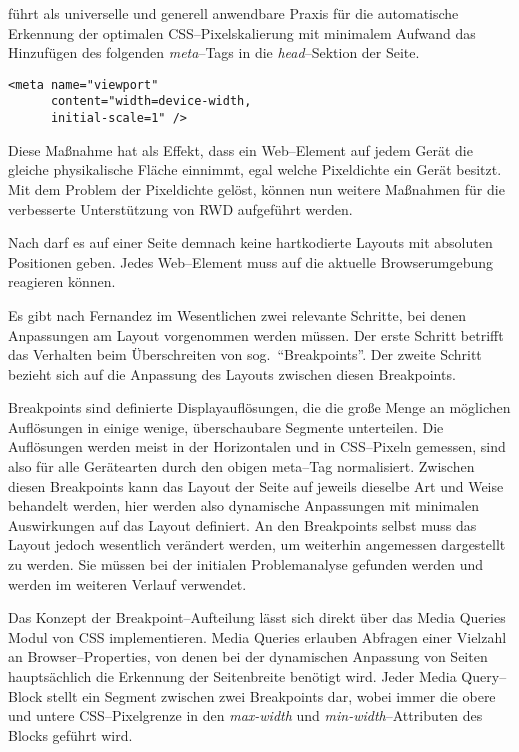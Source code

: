 \autocite{JiangResponsiveWebDesignModeAndApplication.2014} führt als universelle und generell anwendbare Praxis für die automatische Erkennung der optimalen \acs{CSS}--Pixelskalierung mit minimalem Aufwand das Hinzufügen des folgenden \emph{meta}--Tags in die \emph{head}--Sektion der Seite.

\begin{verbatim}
<meta name="viewport"
      content="width=device-width,
      initial-scale=1" />
\end{verbatim}

Diese Maßnahme hat als Effekt, dass ein Web--Element auf jedem Gerät die gleiche physikalische Fläche einnimmt, egal welche Pixeldichte ein Gerät besitzt.
Mit dem Problem der Pixeldichte gelöst, können nun weitere Maßnahmen für die verbesserte Unterstützung von \ac{RWD} aufgeführt werden.

Nach \autocite{Katajisto.CreatingSupportContent.2015} darf es auf einer Seite demnach keine hartkodierte Layouts mit absoluten Positionen geben.
Jedes Web--Element muss auf die aktuelle Browserumgebung reagieren können.

Es gibt nach Fernandez \autocite[S. 3]{MobileWebResponsiveWebdesign.Fernandez.2012} im Wesentlichen zwei relevante Schritte, bei denen Anpassungen am Layout vorgenommen werden müssen.
Der erste Schritt betrifft das Verhalten beim Überschreiten von sog.\ "`Breakpoints"'.
Der zweite Schritt bezieht sich auf die Anpassung des Layouts zwischen diesen Breakpoints.

Breakpoints sind definierte Displayauflösungen, die die große Menge an möglichen Auflösungen in einige wenige, überschaubare Segmente unterteilen.
Die Auflösungen werden meist in der Horizontalen und in \acs{CSS}--Pixeln gemessen, sind also für alle Gerätearten durch den obigen meta--Tag normalisiert.
Zwischen diesen Breakpoints kann das Layout der Seite auf jeweils dieselbe Art und Weise behandelt werden, hier werden also dynamische Anpassungen mit minimalen Auswirkungen auf das Layout definiert.
An den Breakpoints selbst muss das Layout jedoch wesentlich verändert werden, um weiterhin angemessen dargestellt zu werden.
Sie müssen bei der initialen Problemanalyse gefunden werden und werden im weiteren Verlauf verwendet.

Das Konzept der Breakpoint--Aufteilung lässt sich direkt über das Media Queries Modul von \ac{CSS} implementieren.
\autocite{JiangResponsiveWebDesignModeAndApplication.2014}
Media Queries erlauben Abfragen einer Vielzahl an Browser--Properties, von denen bei der dynamischen Anpassung von Seiten hauptsächlich die Erkennung der Seitenbreite benötigt wird.
Jeder Media Query--Block stellt ein Segment zwischen zwei Breakpoints dar, wobei immer die obere und untere \acs{CSS}--Pixelgrenze in den \emph{max-width} und \emph{min-width}--Attributen des Blocks geführt wird.

